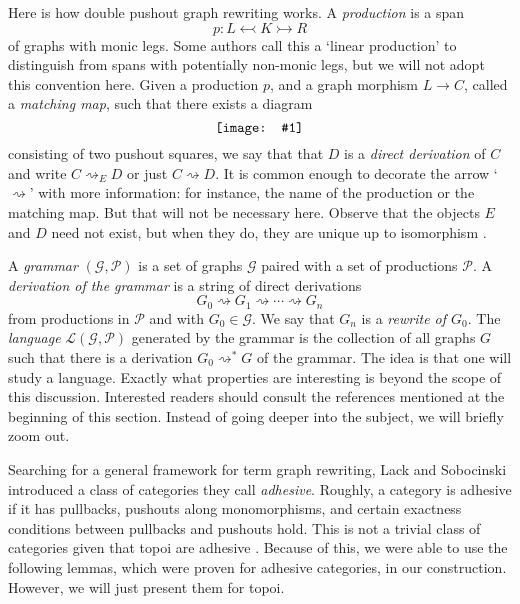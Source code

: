 \documentclass[11pt]{amsart}
\newcommand{\diagram}[1]{\raisebox{-0.5\height}{\texttt{[image: \#1]}}}
\theoremstyle{remark}
\theoremstyle{definition}
\begin{document}
Here is how double pushout graph rewriting works. A \emph{production} is a span 
\[
p: L \leftarrowtail K \rightarrowtail R
\] 
of graphs with monic legs. Some authors call this a `linear production' to distinguish from spans with potentially non-monic legs, but we will not adopt this convention here. Given a production $p$, and a graph morphism $L \to C$, called a \emph{matching map}, such that there exists a diagram
%
\begin{equation}
	\label{diag:derivation}
	\diagram{Diag_Derivation}
\end{equation}
%
consisting of two pushout squares, we say that that $D$ is a \emph{direct derivation} of $C$ and write $C \rightsquigarrow_E D$ or just $C \rightsquigarrow D$. It is common enough to decorate the arrow `$\rightsquigarrow$' with more information: for instance, the name of the production or the matching map.  But that will not be necessary here. Observe that the objects $E$ and $D$ need not exist, but when they do, they are unique up to isomorphism \cite[Lemma 4.5]{LackSoboc_AdhesiveCategories}. 

A \emph{grammar} $(\mathcal{G},\mathcal{P})$ is a set of graphs $\mathcal{G}$ paired with a 
set of productions $\mathcal{P}$. A \textit{derivation of the grammar} is a string of direct derivations 
\[
	G_0 \rightsquigarrow G_1 \rightsquigarrow \dotsm \rightsquigarrow G_n
\] 
from productions in $\mathcal{P}$ and with $G_0 \in \mathcal{G}$. We say that $G_n$ is a \emph{rewrite of $G_0$}. The \textit{language} $\mathcal{L}(\mathcal{G},\mathcal{P})$ generated by the grammar is the collection of all graphs $G$ such that there is a derivation $G_0 \rightsquigarrow^\ast G$ of the grammar. The idea is that one will study a language. Exactly what properties are interesting is beyond the scope of this discussion.  Interested readers should consult the references mentioned at the beginning of this section.  Instead of going deeper into the subject, we will briefly zoom out.
%
%
%
%
%
%

Searching for a general framework for term graph rewriting, Lack and Sobocinski \cite{LackSoboc_AdhesiveCategories} introduced a class of categories they call \emph{adhesive}. Roughly, a category is adhesive if it has pullbacks, pushouts along monomorphisms, and certain exactness conditions between pullbacks and pushouts hold. This is not a trivial class of categories given that topoi are adhesive \cite{LackSoboc_ToposesAdhesive}. Because of this, we were able to use the following lemmas, which were proven for adhesive categories, in our construction. However, we will just present them for topoi.                                 
%
%
%
%
%
%
\end{document}
